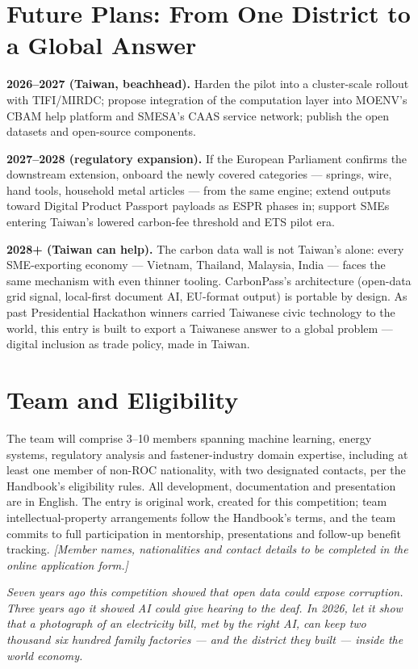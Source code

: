 \section{Future Plans: From One District to a Global Answer}\label{sec:future}

\textbf{2026--2027 (Taiwan, beachhead).} Harden the pilot into a
cluster-scale rollout with TIFI/MIRDC; propose integration of the computation
layer into MOENV's CBAM help platform and SMESA's CAAS service
network\cite{tpt-cbam,caas}; publish the open datasets and open-source
components.

\textbf{2027--2028 (regulatory expansion).} If the European Parliament
confirms the downstream extension, onboard the newly covered categories ---
springs, wire, hand tools, household metal articles --- from the same
engine\cite{akin}; extend outputs toward Digital Product Passport payloads as
ESPR phases in\cite{espr}; support SMEs entering Taiwan's lowered carbon-fee
threshold and ETS pilot era\cite{ecobiz}.

\textbf{2028+ (Taiwan can help).} The carbon data wall is not Taiwan's alone:
every SME-exporting economy --- Vietnam, Thailand, Malaysia, India --- faces
the same mechanism with even thinner tooling. CarbonPass's architecture
(open-data grid signal, local-first document AI, EU-format output) is
portable by design. As past Presidential Hackathon winners carried Taiwanese
civic technology to the world, this entry is built to export a Taiwanese
answer to a global problem --- digital inclusion as trade policy,
made in Taiwan.

\section{Team and Eligibility}\label{sec:team}

The team will comprise 3--10 members spanning machine learning, energy systems,
regulatory analysis and fastener-industry domain expertise, including at least
one member of non-ROC nationality, with two designated contacts, per the
Handbook's eligibility rules\cite{handbook}. All development, documentation and
presentation are in English. The entry is original work, created for this
competition; team intellectual-property arrangements follow the Handbook's
terms, and the team commits to full participation in mentorship, presentations
and follow-up benefit tracking. \emph{[Member names, nationalities and contact
details to be completed in the online application form.]}

\vspace{4mm}
\begin{center}
\begin{minipage}{0.86\textwidth}
\centering\itshape
Seven years ago this competition showed that open data could expose corruption.
Three years ago it showed AI could give hearing to the deaf. In 2026, let it
show that a photograph of an electricity bill, met by the right AI, can keep
two thousand six hundred family factories --- and the district they built ---
inside the world economy.
\end{minipage}
\end{center}
